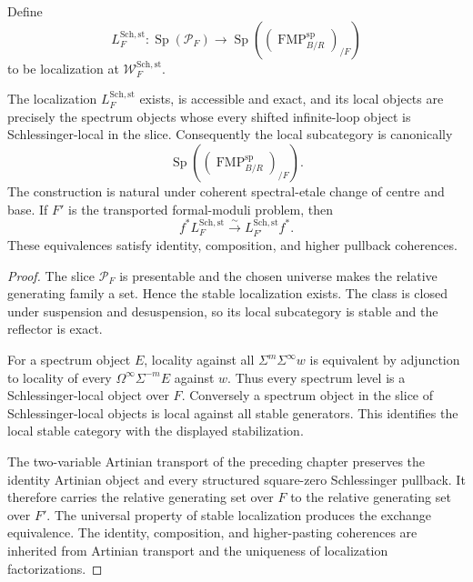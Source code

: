 \begin{definition}
\label{def:as-stable-schlessinger-reflector}
Define
\[
\boxed{
    L_F^{\mathrm{Sch,st}}:
    \operatorname{Sp}(\mathcal P_F)
    \longrightarrow
    \operatorname{Sp}
    \left((\operatorname{FMP}^{\mathrm{sp}}_{B/R})_{/F}\right)}
\]
to be localization at
$\mathcal W_F^{\mathrm{Sch,st}}$.
\end{definition}

\begin{proposition}
\label{prop:as-stable-schlessinger-exists}
The localization $L_F^{\mathrm{Sch,st}}$ exists, is accessible and exact, and
its local objects are precisely the spectrum objects whose every shifted
infinite-loop object is Schlessinger-local in the slice.  Consequently the
local subcategory is canonically
\[
\boxed{
    \operatorname{Sp}
    \left((\operatorname{FMP}^{\mathrm{sp}}_{B/R})_{/F}\right).}
\]
The construction is natural under coherent spectral-etale change of centre
and base.  If $F'$ is the transported formal-moduli problem, then
\[
\boxed{
    f^*L_F^{\mathrm{Sch,st}}
    \xrightarrow{\sim}
    L_{F'}^{\mathrm{Sch,st}}f^*.}
\]
These equivalences satisfy identity, composition, and higher pullback
coherences.
\end{proposition}

\begin{proof}
The slice $\mathcal P_F$ is presentable and the chosen universe makes the
relative generating family a set.  Hence the stable localization exists.
The class is closed under suspension and desuspension, so its local
subcategory is stable and the reflector is exact.

For a spectrum object $E$, locality against all
$\Sigma^m\Sigma^\infty w$ is equivalent by adjunction to locality of every
$\Omega^\infty\Sigma^{-m}E$ against $w$.  Thus every spectrum level is a
Schlessinger-local object over $F$.  Conversely a spectrum object in the
slice of Schlessinger-local objects is local against all stable generators.
This identifies the local stable category with the displayed stabilization.

The two-variable Artinian transport of the preceding chapter preserves the
identity Artinian object and every structured square-zero Schlessinger
pullback.  It therefore carries the relative generating set over $F$ to the
relative generating set over $F'$.  The universal property of stable
localization produces the exchange equivalence.  The identity, composition,
and higher-pasting coherences are inherited from Artinian transport and the
uniqueness of localization factorizations.
\end{proof}

